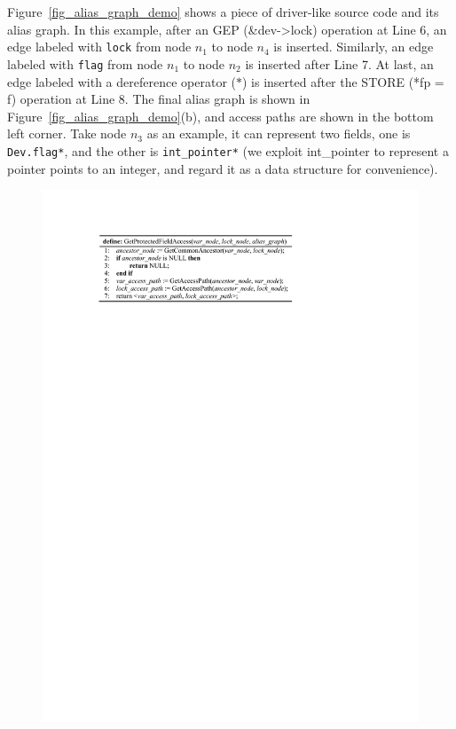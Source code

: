  Figure~\ref{fig_alias_graph_demo} shows a 
piece of driver-like source code and its alias graph. In this example, after an 
GEP (\&dev->lock) operation at Line 6, an edge labeled with {\tt lock} from 
node $\mathit{n_1}$ to node $\mathit{n_4}$ is inserted. Similarly, an edge 
labeled with {\tt flag} from node $\mathit{n_1}$ to node $\mathit{n_2}$ is 
inserted after Line 7. At last, an edge labeled with a dereference operator 
($\mathit{*}$) is inserted after the STORE (*fp = f) operation at Line 8. The 
final alias graph is shown in Figure~\ref{fig_alias_graph_demo}(b), and access 
paths are shown in the bottom left corner. Take node $\mathit{n_3}$ as an 
example, it can represent two fields, one is {\tt Dev.flag*}, and the other is 
{\tt int\_pointer*} (we exploit int\_pointer to represent a pointer points to 
an integer, and regard it as a data structure for convenience). 

\begin{figure}[htbp]
	\centering
	\includegraphics[width=1\linewidth]{figures/fig_pseudocode_get_access.pdf}
	\label{fig_pseudocode_get_access}
\end{figure}


